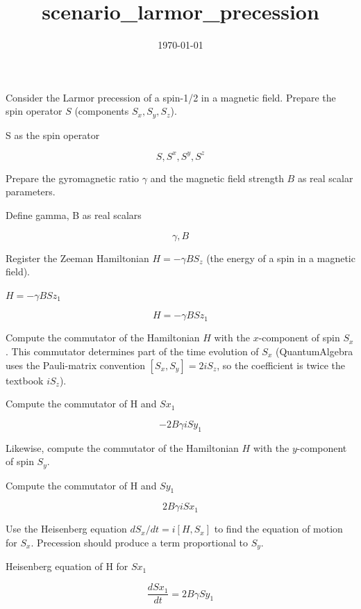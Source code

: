 \documentclass[dvipdfmx]{article}
\title{scenario\_larmor\_precession}
\date{\today}
\begin{document}
\maketitle

Consider the Larmor precession of a spin-1/2 in a magnetic field. Prepare the spin operator $S$ (components $S_x,S_y,S_z$).

S as the spin operator

\[
  S, S^{x}, S^{y}, S^{z}
\]

Prepare the gyromagnetic ratio $\gamma$ and the magnetic field strength $B$ as real scalar parameters.

Define gamma, B as real scalars

\[
  \gamma, B
\]

Register the Zeeman Hamiltonian $H=-\gamma BS_z$ (the energy of a spin in a magnetic field).

$H = -\gamma B Sz_1$

\begin{equation}
  H = -\gamma B Sz_1
  \label{eq:E1}
\end{equation}

Compute the commutator of the Hamiltonian $H$ with the $x$-component of spin $S_x$. This commutator determines part of the time evolution of $S_x$ (QuantumAlgebra uses the Pauli-matrix convention $[S_x,S_y]=2iS_z$, so the coefficient is twice the textbook $iS_z$).

Compute the commutator of H and $Sx_1$

\begin{equation}
  - 2 B \gamma \mathit{i} Sy_1
  \label{eq:E2}
\end{equation}

Likewise, compute the commutator of the Hamiltonian $H$ with the $y$-component of spin $S_y$.

Compute the commutator of H and $Sy_1$

\begin{equation}
  2 B \gamma \mathit{i} Sx_1
  \label{eq:E3}
\end{equation}

Use the Heisenberg equation $dS_x/dt=i[H,S_x]$ to find the equation of motion for $S_x$. Precession should produce a term proportional to $S_y$.

Heisenberg equation of H for $Sx_1$

\begin{equation}
  \frac{d Sx_1}{d t} = 2 B \gamma Sy_1
  \label{eq:E4}
\end{equation}
\end{document}
